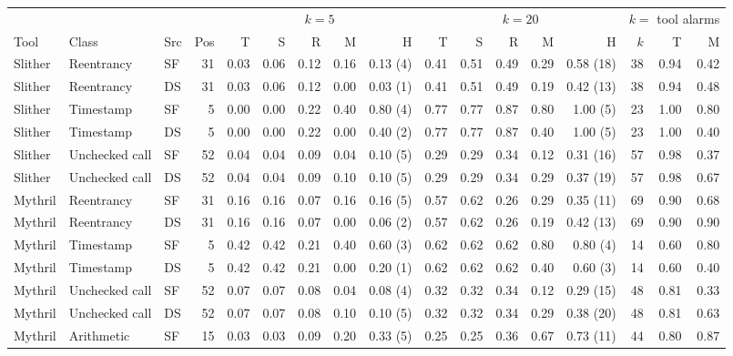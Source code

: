 \begin{tabular}{@{}lllrrrrrrrrrrrrrr@{}}
\toprule
 & & & & \multicolumn{5}{c}{$k=5$} & \multicolumn{5}{c}{$k=20$} & \multicolumn{3}{c}{$k=$ tool alarms}\\
\cmidrule(lr){5-9}\cmidrule(lr){10-14}\cmidrule(lr){15-17}
Tool & Class & Src & Pos & T & S & R & M & H & T & S & R & M & H & $k$ & T & M\\
\midrule
Slither & Reentrancy & SF & 31 & 0.03 & 0.06 & 0.12 & 0.16 & 0.13 (4) & 0.41 & 0.51 & 0.49 & 0.29 & 0.58 (18) & 38 & 0.94 & 0.42\\
Slither & Reentrancy & DS & 31 & 0.03 & 0.06 & 0.12 & 0.00 & 0.03 (1) & 0.41 & 0.51 & 0.49 & 0.19 & 0.42 (13) & 38 & 0.94 & 0.48\\
Slither & Timestamp & SF & 5 & 0.00 & 0.00 & 0.22 & 0.40 & 0.80 (4) & 0.77 & 0.77 & 0.87 & 0.80 & 1.00 (5) & 23 & 1.00 & 0.80\\
Slither & Timestamp & DS & 5 & 0.00 & 0.00 & 0.22 & 0.00 & 0.40 (2) & 0.77 & 0.77 & 0.87 & 0.40 & 1.00 (5) & 23 & 1.00 & 0.40\\
Slither & Unchecked call & SF & 52 & 0.04 & 0.04 & 0.09 & 0.04 & 0.10 (5) & 0.29 & 0.29 & 0.34 & 0.12 & 0.31 (16) & 57 & 0.98 & 0.37\\
Slither & Unchecked call & DS & 52 & 0.04 & 0.04 & 0.09 & 0.10 & 0.10 (5) & 0.29 & 0.29 & 0.34 & 0.29 & 0.37 (19) & 57 & 0.98 & 0.67\\
Mythril & Reentrancy & SF & 31 & 0.16 & 0.16 & 0.07 & 0.16 & 0.16 (5) & 0.57 & 0.62 & 0.26 & 0.29 & 0.35 (11) & 69 & 0.90 & 0.68\\
Mythril & Reentrancy & DS & 31 & 0.16 & 0.16 & 0.07 & 0.00 & 0.06 (2) & 0.57 & 0.62 & 0.26 & 0.19 & 0.42 (13) & 69 & 0.90 & 0.90\\
Mythril & Timestamp & SF & 5 & 0.42 & 0.42 & 0.21 & 0.40 & 0.60 (3) & 0.62 & 0.62 & 0.62 & 0.80 & 0.80 (4) & 14 & 0.60 & 0.80\\
Mythril & Timestamp & DS & 5 & 0.42 & 0.42 & 0.21 & 0.00 & 0.20 (1) & 0.62 & 0.62 & 0.62 & 0.40 & 0.60 (3) & 14 & 0.60 & 0.40\\
Mythril & Unchecked call & SF & 52 & 0.07 & 0.07 & 0.08 & 0.04 & 0.08 (4) & 0.32 & 0.32 & 0.34 & 0.12 & 0.29 (15) & 48 & 0.81 & 0.33\\
Mythril & Unchecked call & DS & 52 & 0.07 & 0.07 & 0.08 & 0.10 & 0.10 (5) & 0.32 & 0.32 & 0.34 & 0.29 & 0.38 (20) & 48 & 0.81 & 0.63\\
Mythril & Arithmetic & SF & 15 & 0.03 & 0.03 & 0.09 & 0.20 & 0.33 (5) & 0.25 & 0.25 & 0.36 & 0.67 & 0.73 (11) & 44 & 0.80 & 0.87\\

\end{tabular}
